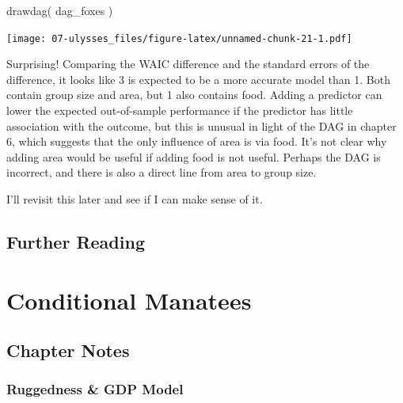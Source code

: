 \documentclass[
]{book}
\newenvironment{Shaded}{\begin{snugshade}}{\end{snugshade}}
\newcommand{\FunctionTok}[1]{\textcolor[rgb]{0.00,0.00,0.00}{#1}}
\newcommand{\NormalTok}[1]{#1}
\begin{document}
\begin{Shaded}
\begin{Highlighting}[]
\FunctionTok{drawdag}\NormalTok{( dag\_foxes )}
\end{Highlighting}
\end{Shaded}

\texttt{[image: 07-ulysses\_files/figure-latex/unnamed-chunk-21-1.pdf]}

Surprising! Comparing the WAIC difference and the standard errors of the difference, it looks like 3 is expected to be a more accurate model than 1. Both contain group size and area, but 1 also contains food. Adding a predictor can lower the expected out-of-sample performance if the predictor has little association with the outcome, but this is unusual in light of the DAG in chapter 6, which suggests that the only influence of area is via food. It's not clear why adding area would be useful if adding food is not useful. Perhaps the DAG is incorrect, and there is also a direct line from area to group size.

I'll revisit this later and see if I can make sense of it.

\hypertarget{further-reading-6}{%
\section*{Further Reading}\label{further-reading-6}}

\hypertarget{conditional}{%
\chapter{Conditional Manatees}\label{conditional}}

\hypertarget{chapter-notes-7}{%
\section{Chapter Notes}\label{chapter-notes-7}}

\hypertarget{ruggedness-gdp-model}{%
\subsection*{Ruggedness \& GDP Model}\label{ruggedness-gdp-model}}
\end{document}
